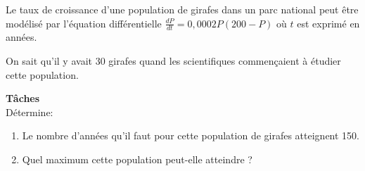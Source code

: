   \begin{exercice}
  Le taux de croissance d'une population de girafes dans un parc national peut être modélisé par l'équation différentielle $ \frac{dP}{dt} =0,0002P(200-P)$ où $ t $ est exprimé en années.
  
  
  On sait qu'il y avait 30 girafes quand les scientifiques commençaient à étudier cette population.
  
  
  \textbf{Tâches}\\ Détermine:
  \begin{enumerate}
  \item  Le nombre d'années qu'il faut pour cette population  de girafes atteignent 150.
  \item Quel  maximum  cette population peut-elle atteindre ?
  \end{enumerate}
  \end{exercice}









